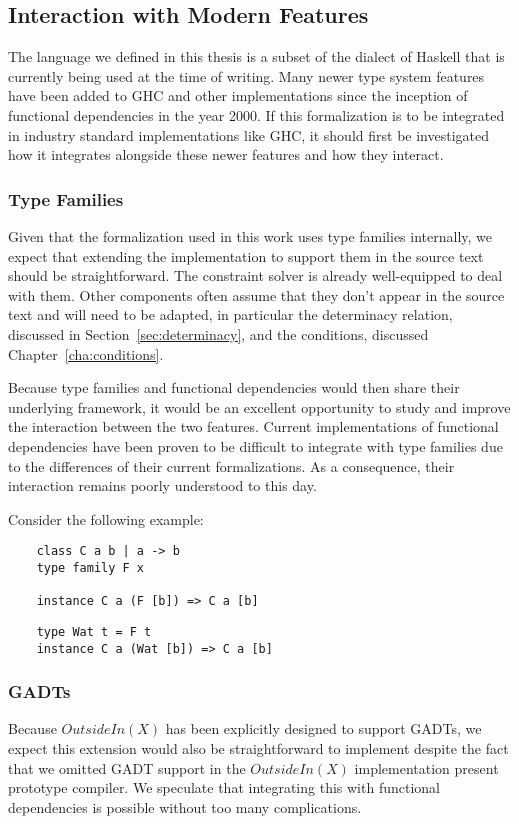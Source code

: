 \subsection{Interaction with Modern Features}

The language we defined in this thesis is a subset of the dialect of Haskell
that is currently being used at the time of writing. Many newer type system
features have been added to GHC and other implementations since the inception of
functional dependencies in the year 2000. If this formalization is to be
integrated in industry standard implementations like GHC, it should first be
investigated how it integrates alongside these newer features and how they
interact.

\subsubsection{Type Families}

Given that the formalization used in this work uses type families internally, we
expect that extending the implementation to support them in the source text
should be straightforward. The constraint solver is already well-equipped to
deal with them. Other components often assume that they don't appear
in the source text and will need to be adapted, in particular the determinacy
relation, discussed in Section~\ref{sec:determinacy}, and the conditions,
discussed Chapter~\ref{cha:conditions}.

Because type families and functional dependencies would then share their
underlying framework, it would be an excellent opportunity to study and
improve the interaction between the two features. Current implementations of
functional dependencies have been proven to be difficult to integrate with type
families due to the differences of their current formalizations. As a consequence,
their interaction remains poorly understood to this day.

Consider the following example:

\begin{verbatim}
    class C a b | a -> b
    type family F x

    instance C a (F [b]) => C a [b]
\end{verbatim}

\begin{verbatim}
    type Wat t = F t
    instance C a (Wat [b]) => C a [b]
\end{verbatim}

\subsubsection{GADTs}

Because $OutsideIn(X)$ has been explicitly designed to support GADTs, we expect
this extension would also be straightforward to implement despite the fact that
we omitted GADT support in the $OutsideIn(X)$ implementation present prototype
compiler. We speculate that integrating this with functional dependencies is
possible without too many complications.
